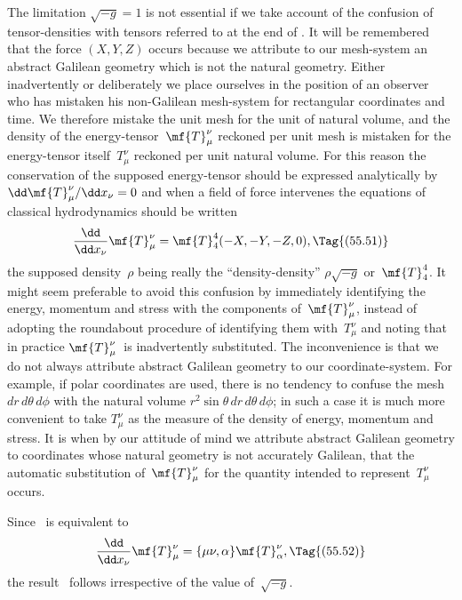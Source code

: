 \documentclass[12pt]{book}
\begin{document}
The limitation $\sqrt{-g} = 1$ is not essential if we take account of the confusion
of tensor\hyp{}densities with tensors referred to at the end of . It will
be remembered that the force $(X, Y, Z)$ occurs because we attribute to our
mesh-system an abstract Galilean geometry which is not the natural geometry.
Either inadvertently or deliberately we place ourselves in the position
of an observer who has mistaken his non-Galilean mesh-system for rectangular
coordinates and time. We therefore mistake the unit mesh for the unit of
natural volume, and the density of the energy-tensor~$\mf{T}_{\mu}^{\nu}$ reckoned per unit
mesh is mistaken for the energy-tensor itself~$T_{\mu}^{\nu}$ reckoned per unit natural
volume. For this reason the conservation of the supposed energy-tensor
should be expressed analytically by $\dd\mf{T}_{\mu}^{\nu}/\dd x_{\nu} = 0$ and when a field of force
intervenes the equations of classical hydrodynamics should be written
\[
\frac{\dd}{\dd x_{\nu}} \mf{T}_{\mu}^{\nu}
= \mf{T}_{4}^{4}(-X, -Y, -Z, 0),
\Tag{(55.51)}
\]
the supposed density~$\rho$ being really the ``density-density'' $\rho\sqrt{-g}$ or~$\mf{T}_{4}^{4}$\footnotemark.\footnotetext
  {It might seem preferable to avoid this confusion by immediately identifying the energy,
  momentum and stress with the components of~$\mf{T}_{\mu}^{\nu}$, instead of adopting the roundabout procedure
  of identifying them with~$T_{\mu}^{\nu}$ and noting that in practice $\mf{T}_{\mu}^{\nu}$~is inadvertently substituted. The
  inconvenience is that we do not always attribute abstract Galilean geometry to our coordinate-system.
  For example, if polar coordinates are used, there is no tendency to confuse the mesh
  $dr\, d\theta\, d\phi$ with the natural volume $r^{2} \sin\theta\, dr\, d\theta\, d\phi$; in such a case it is much more convenient to
  take $T_{\mu}^{\nu}$ as the measure of the density of energy, momentum and stress. It is when by our
  attitude of mind we attribute abstract Galilean geometry to coordinates whose natural geometry
  is not accurately Galilean, that the automatic substitution of~$\mf{T}_{\mu}^{\nu}$ for the quantity intended to
  represent~$T_{\mu}^{\nu}$ occurs.}

Since ~is equivalent to
\[
\frac{\dd}{\dd x_{\nu}} \mf{T}_{\mu}^{\nu}
= \{\mu\nu, \alpha\} \mf{T}_{\alpha}^{\nu},
\Tag{(55.52)}
\]
the result~ follows irrespective of the value of~$\sqrt{-g}$.
\end{document}

